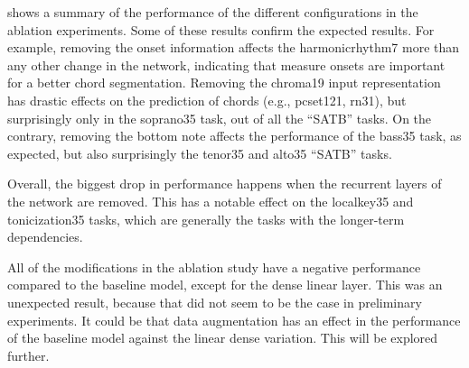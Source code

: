 

 shows a summary of the performance of the
different configurations in the ablation experiments. Some
of these results confirm the expected results. For example,
removing the onset information affects the
\gls{harmonicrhythm7} more than any other change in the
network, indicating that measure onsets are important for a
better chord segmentation. Removing the \gls{chroma19} input
representation has drastic effects on the prediction of
chords (e.g., \gls{pcset121}, \gls{rn31}), but surprisingly
only in the \gls{soprano35} task, out of all the ``SATB''
tasks. On the contrary, removing the bottom note affects the
performance of the \gls{bass35} task, as expected, but also
surprisingly the \gls{tenor35} and \gls{alto35} ``SATB''
tasks.

Overall, the biggest drop in performance happens when the
recurrent layers of the network are removed. This has a
notable effect on the \gls{localkey35} and
\gls{tonicization35} tasks, which are generally the tasks
with the longer-term dependencies. 

All of the modifications in the ablation study have a
negative performance compared to the baseline model, except
for the dense linear layer. This was an unexpected result,
because that did not seem to be the case in preliminary
experiments. It could be that data augmentation has an
effect in the performance of the baseline model against the
linear dense variation. This will be explored further.
